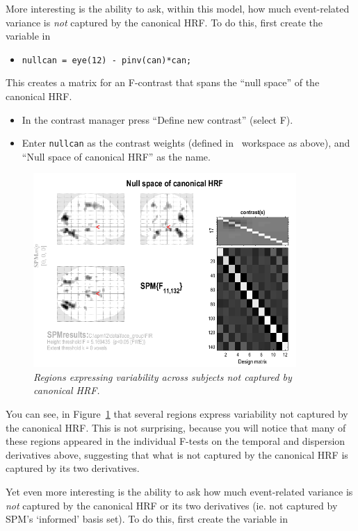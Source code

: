 More interesting is the ability to ask, within this model, how much event-related variance is \emph{not} captured by the canonical HRF. To do this, first create the variable in \matlab\:
\begin{itemize}
\item \verb!nullcan = eye(12) - pinv(can)*can;!
\end{itemize}

This creates a matrix for an F-contrast that spans the ``null space'' of the canonical HRF.
\begin{itemize}
\item In the contrast manager press ``Define new contrast'' (select F).
\item Enter \texttt{nullcan} as the contrast weights (defined in \matlab\ workspace as above), and ``Null space of canonical HRF'' as the name.
\end{itemize}

\begin{figure}
\begin{center}
\includegraphics[width=100mm]{faces_group/nullcan}
\caption{\em Regions expressing variability across subjects not captured by canonical HRF. \label{nullcan}}
\end{center}
\end{figure}
You can see, in Figure~\ref{nullcan} that several regions express variability not captured by the canonical HRF. This is not surprising, because you will notice that many of these regions appeared in the individual F-tests on the temporal and dispersion derivatives above, suggesting that what is not captured by the canonical HRF is captured by its two derivatives.

Yet even more interesting is the ability to ask how much event-related variance is \emph{not} captured by the canonical HRF or its two derivatives (ie. not captured by SPM's `informed' basis set). To do this, first create the variable in \matlab\: 

